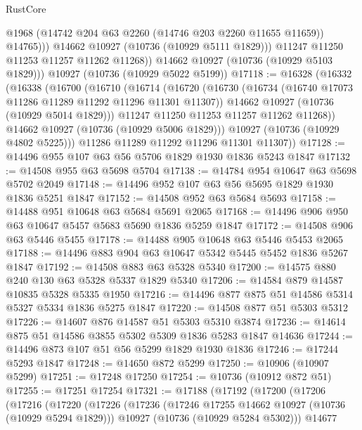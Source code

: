 \begin{lexlean}{RustCore}
\begin{coremodule}
                  @1968
                  (@14742 @204 @63 @2260 (@14746 @203 @2260 @11655 @11659))
                  @14765)))
            @14662
            @10927
            (@10736 (@10929 @5111 @1829)))
          @11247
          @11250
          @11253
          @11257
          @11262
          @11268))
      @14662
      @10927
      (@10736 (@10929 @5103 @1829)))
    @10927
    (@10736 (@10929 @5022 @5199))
@17118 := @16328
    (@16332
      (@16338
        (@16700
          (@16710
            (@16714
              (@16720
                (@16730
                  (@16734 (@16740 @17073 @11286 @11289 @11292 @11296 @11301 @11307))
                  @14662
                  @10927
                  (@10736 (@10929 @5014 @1829)))
                @11247
                @11250
                @11253
                @11257
                @11262
                @11268))
            @14662
            @10927
            (@10736 (@10929 @5006 @1829)))
          @10927
          (@10736 (@10929 @4802 @5225)))
        @11286
        @11289
        @11292
        @11296
        @11301
        @11307))
@17128 := @14496 @955 @107 @63 @56 @5706 @1829 @1930 @1836 @5243 @1847
@17132 := @14508 @955 @63 @5698 @5704
@17138 := @14784 @954 @10647 @63 @5698 @5702 @2049
@17148 := @14496 @952 @107 @63 @56 @5695 @1829 @1930 @1836 @5251 @1847
@17152 := @14508 @952 @63 @5684 @5693
@17158 := @14488 @951 @10648 @63 @5684 @5691 @2065
@17168 := @14496 @906 @950 @63 @10647 @5457 @5683 @5690 @1836 @5259 @1847
@17172 := @14508 @906 @63 @5446 @5455
@17178 := @14488 @905 @10648 @63 @5446 @5453 @2065
@17188 := @14496 @883 @904 @63 @10647 @5342 @5445 @5452 @1836 @5267 @1847
@17192 := @14508 @883 @63 @5328 @5340
@17200 := @14575 @880 @240 @130 @63 @5328 @5337 @1829 @5340
@17206 := @14584 @879 @14587 @10835 @5328 @5335 @1950
@17216 := @14496 @877 @875 @51 @14586 @5314 @5327 @5334 @1836 @5275 @1847
@17220 := @14508 @877 @51 @5303 @5312
@17226 := @14607 @876 @14587 @51 @5303 @5310 @3874
@17236 := @14614 @875 @51 @14586 @3855 @5302 @5309 @1836 @5283 @1847 @14636
@17244 := @14496 @873 @107 @51 @56 @5299 @1829 @1930 @1836
@17246 := @17244 @5293 @1847
@17248 := @14650 @872 @5299
@17250 := @10906 (@10907 @5299)
@17251 := @17248 @17250
@17254 := @10736 (@10912 @872 @51)
@17255 := @17251 @17254
@17321 := @17188
    (@17192
      (@17200
        (@17206
          (@17216
            (@17220
              (@17226
                (@17236
                  (@17246 @17255 @14662 @10927 (@10736 (@10929 @5294 @1829)))
                  @10927
                  (@10736 (@10929 @5284 @5302)))
                @14677

\end{coremodule}
\end{lexlean}
